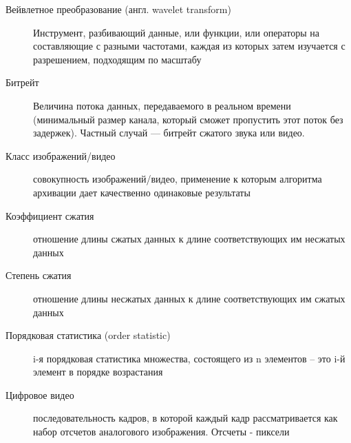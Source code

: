 \Defines %
\begin{description}
\item[Вейвлетное преобразование (англ. wavelet transform)] Инструмент, разбивающий данные, или функции, 
или операторы на составляющие с разными частотами, каждая из которых затем изучается с разрешением, подходящим по масштабу \cite{Pup01}
\end{description}
\begin{description}
\item[Битрейт] Величина потока данных, передаваемого в реальном времени (минимальный размер канала, который сможет пропустить этот поток без задержек). Частный случай — битрейт сжатого звука или видео.
\end{description}
\begin{description}
\item[Класс изображений/видео] совокупность изображений/видео, применение к которым алгоритма архивации дает качественно одинаковые результаты \cite{Pup02}
\end{description}
\begin{description}
\item[Коэффициент сжатия] отношение длины сжатых данных к длине соответствующих им несжатых данных \cite{Pup02}
\end{description}
\begin{description}
\item[Степень сжатия] отношение длины несжатых данных к длине соответствующих им сжатых данных \cite{Pup02}
\end{description}
\begin{description}
\item[Порядковая статистика (order statistic)] i-я порядковая статистика множества, состоящего из n элементов – это i-й элемент в порядке возрастания \cite{Pup05}
\end{description}
\begin{description}
\item[Цифровое видео] последовательность кадров, в которой каждый кадр рассматривается как набор отсчетов аналогового изображения. Отсчеты - пиксели \cite{Pup07}
\end{description}
